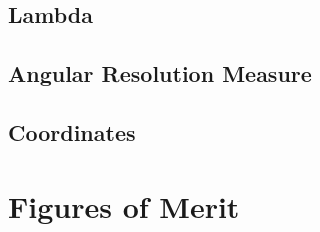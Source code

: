 \subsection{Lambda}\label{ssec:lambda}

\subsection{Angular Resolution Measure}\label{ssec:arm}

\subsection{Coordinates}\label{ssec:coord}

\section{Figures of Merit}
